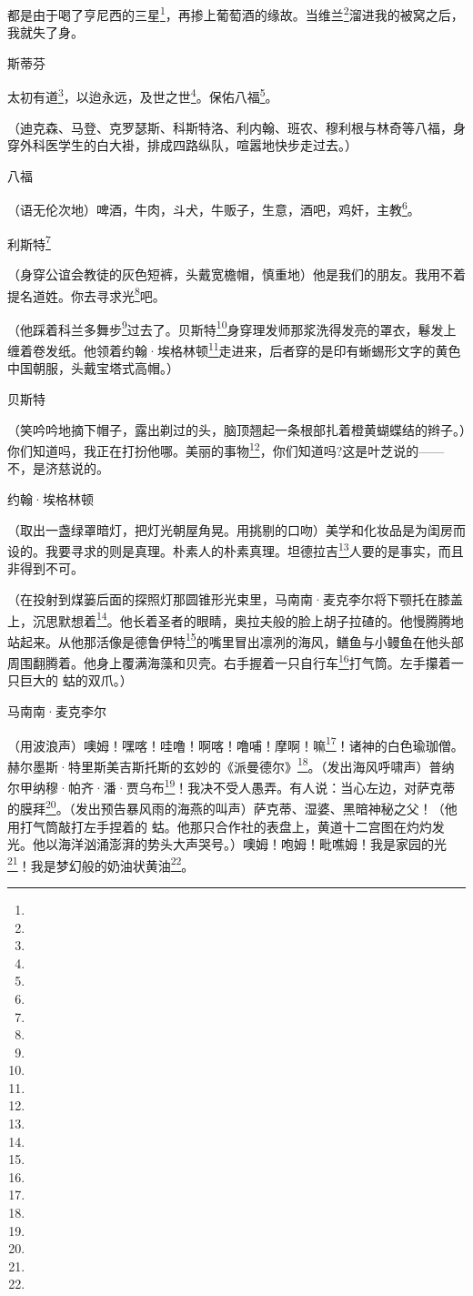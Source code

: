 \par 都是由于喝了亨尼西的三星\footnote{}，再掺上葡萄酒的缘故。当维兰\footnote{}溜进我的被窝之后，我就失了身。
\par 斯蒂芬
\par 太初有道\footnote{}，以迨永远，及世之世\footnote{}。保佑八福\footnote{}。
\par （迪克森、马登、克罗瑟斯、科斯特洛、利内翰、班农、穆利根与林奇等八福，身穿外科医学生的白大褂，排成四路纵队，喧嚣地快步走过去。）
\par 八福
\par （语无伦次地）啤酒，牛肉，斗犬，牛贩子，生意，酒吧，鸡奸，主教\footnote{}。
\par 利斯特\footnote{}
\par （身穿公谊会教徒的灰色短裤，头戴宽檐帽，慎重地）他是我们的朋友。我用不着提名道姓。你去寻求光\footnote{}吧。
\par （他踩着科兰多舞步\footnote{}过去了。贝斯特\footnote{}身穿理发师那浆洗得发亮的罩衣，鬈发上缠着卷发纸。他领着约翰·埃格林顿\footnote{}走进来，后者穿的是印有蜥蜴形文字的黄色中国朝服，头戴宝塔式高帽。）
\par 贝斯特
\par （笑吟吟地摘下帽子，露出剃过的头，脑顶翘起一条根部扎着橙黄蝴蝶结的辫子。）你们知道吗，我正在打扮他哪。美丽的事物\footnote{}，你们知道吗?这是叶芝说的——不，是济慈说的。
\par 约翰·埃格林顿
\par （取出一盏绿罩暗灯，把灯光朝屋角晃。用挑剔的口吻）美学和化妆品是为闺房而设的。我要寻求的则是真理。朴素人的朴素真理。坦德拉吉\footnote{}人要的是事实，而且非得到不可。
\par （在投射到煤篓后面的探照灯那圆锥形光束里，马南南·麦克李尔将下颚托在膝盖上，沉思默想着\footnote{}。他长着圣者的眼睛，奥拉夫般的脸上胡子拉碴的。他慢腾腾地站起来。从他那活像是德鲁伊特\footnote{}的嘴里冒出凛冽的海风，鳝鱼与小鳗鱼在他头部周围翻腾着。他身上覆满海藻和贝壳。右手握着一只自行车\footnote{}打气筒。左手攥着一只巨大的 蛄的双爪。）
\par 马南南·麦克李尔
\par （用波浪声）噢姆！嘿喀！哇噜！啊喀！噜哺！摩啊！嘛\footnote{}！诸神的白色瑜珈僧。赫尔墨斯·特里斯美吉斯托斯的玄妙的《派曼德尔》\footnote{}。（发出海风呼啸声）普纳尔甲纳穆·帕齐·潘·贾乌布\footnote{}！我决不受人愚弄。有人说：当心左边，对萨克蒂的膜拜\footnote{}。（发出预告暴风雨的海燕的叫声）萨克蒂、湿婆、黑暗神秘之父！（他用打气筒敲打左手捏着的 蛄。他那只合作社的表盘上，黄道十二宫图在灼灼发光。他以海洋汹涌澎湃的势头大声哭号。）噢姆！咆姆！毗噍姆！我是家园的光\footnote{}！我是梦幻般的奶油状黄油\footnote{}。
